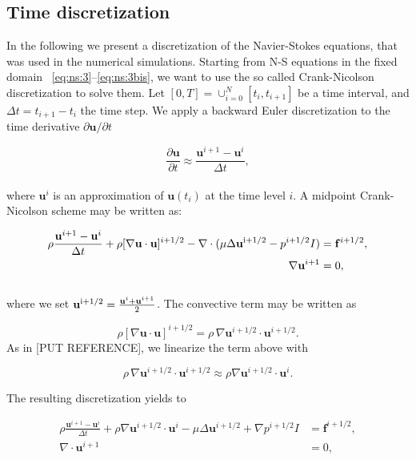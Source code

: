 \documentclass[a4paper,11pt,openright,twoside]{book}
\begin{document}
\subsection{Time discretization}
In the following we present a discretization of the Navier-Stokes equations, that was used in the numerical simulations. Starting from N-S equations in the fixed domain ~\eqref{eq:ns:3}--\eqref{eq:ns:3bis}, we want to use the so called Crank-Nicolson discretization to solve them. Let $[0, T] = \cup^N_{i=0} [t_i, t_{i+1}] $ be a time interval, and $\Delta t = t_{i+1} - t_i$ the time step. We apply a backward Euler discretization to the time derivative $\partial \mathbf{u}/ \partial t$

\begin{equation}
\frac{\partial \mathbf{u}}{\partial t} \approx \frac{\mathbf{u}^{i+1} -\mathbf{u}^i }{\Delta t},
\end{equation}
\\
where $\mathbf{u}^i$ is an approximation of $\mathbf{u}(t_i)$ at the time level $i$. A midpoint Crank-Nicolson scheme may be written as:

\begin{align}
\rho \frac{\mathbf{u}^{i+1} - \mathbf{u}^i}{\Delta t} + \rho [\nabla \mathbf{u} \cdot \mathbf{u}]^{i+1/2} - \nabla \cdot (\mu \Delta \mathbf{u}^{\rm  i+1/2} - p^{i+1/2}I) &= \mathbf{f}^{i+1/2}, \\
\nabla \mathbf{u}^{i+1} &= 0,
\end{align}
\\
where we set $\mathbf{u}^{\rm i+1/2} = \frac{\mathbf{u}^i + \mathbf{u}^{i+1}}{2}$.
The convective term may be written as

\begin{equation}
\rho [\nabla \mathbf{u} \cdot \mathbf{u}]^{i+1/2} = \rho \, \nabla \mathbf{u}^{i+1/2} \cdot \mathbf{u}^{i+1/2}.
\end{equation}
As in [PUT REFERENCE], we linearize the term above with

\begin{equation}
\rho \, \nabla \mathbf{u}^{i+1/2} \cdot \mathbf{u}^{i+1/2} \approx \rho \nabla \mathbf{u}^{i+1/2} \cdot \mathbf{u}^i.
\end{equation}

The resulting discretization yields to

\begin{align}
\label{eq:ns:10}
\rho \frac{\mathbf{u}^{i+1} - \mathbf{u}^i}{\Delta t} + \rho \nabla \mathbf{u}^{i+1/2} \cdot \mathbf{u}^i - \mu \Delta \mathbf{u}^{i+1/2} + \nabla p^{i+1/2}I &= \mathbf{f}^{i+1/2}, \\
\label{eq:ns:10bis}
\nabla \cdot \mathbf{u}^{i+1} &= 0,
\end{align}
\end{document}
